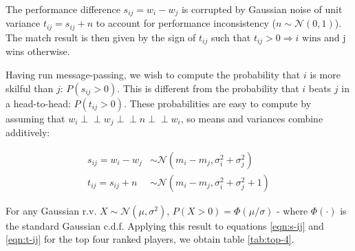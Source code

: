 \documentclass[]{article}
\newcommand{\Ncal}{\mathcal{N}}
\newcommand{\indep}{\perp \!\!\! \perp}
\begin{document}
The performance difference $s_{ij} = w_i - w_j$ is corrupted by Gaussian noise of unit variance $t_{ij} = s_{ij} + n$ to account for performance inconsistency ($n \sim \Ncal(0, 1)$). The match result is then given by the sign of $t_{ij}$ such that $t_{ij} > 0 \Rightarrow i \text{ wins}$ and j wins otherwise.

Having run message-passing, we wish to compute the probability that $i$ is more skilful than $j$: $P(s_{ij} > 0)$. This is different from the probability that $i$ beats $j$ in a head-to-head: $P(t_{ij} > 0)$. These probabilities are easy to compute by assuming that $w_i \indep w_j \indep n \indep w_i$, so means and variances combine additively:

\begin{align}
		s_{ij} = w_i - w_j &\sim \Ncal(m_i - m_j, \sigma_i^2 + \sigma_j^2)
		\label{eqn:s-ij} \\	
		t_{ij} = s_{ij} + n &\sim \Ncal(m_i - m_j, \sigma_i^2 + \sigma_j^2 + 1)
		\label{eqn:t-ij}
\end{align}

For any Gaussian r.v. $X \sim \Ncal(\mu, \sigma^2)$, $P(X > 0) = \Phi(\mu / \sigma)$ - where $\Phi(\cdot)$ is the standard Gaussian c.d.f. Applying this result to equations \ref{eqn:s-ij} and \ref{eqn:t-ij} for the top four ranked players, we obtain table \ref{tab:top-4}.

\begin{table}[!h]
	\caption{Top four players comparison}
	\label{tab:top-4}
\end{table}
\end{document}
